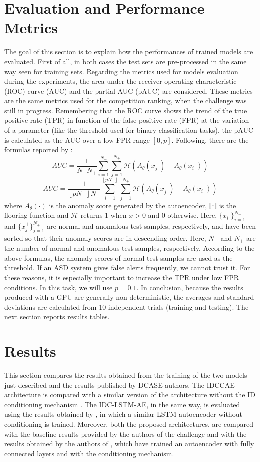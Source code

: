\section{Evaluation and Performance Metrics}
The goal of this section is to explain how the performances of trained models are evaluated. First of all, in both cases the test sets are pre-processed in the same way seen for training sets. Regarding the metrics used for models evaluation during the experiments, the area under the receiver operating characteristic (ROC) curve (AUC) and the partial-AUC (pAUC) are considered. These metrics are the same metrics used for the competition ranking, when the challenge was still in progress. Remembering that the ROC curve shows the trend of the true positive rate (TPR) in function of the false positive rate (FPR) at the variation of a parameter (like the threshold used for binary classification tasks), the pAUC is calculated as the AUC over a low FPR range $[0,p]$. Following, there are the formulas reported by \cite{DCASE}:
\[ AUC =\frac{1}{N_-N_+}\sum_{i=1}^{N_-}\sum_{j=1}^{N_+}\mathcal{H}(A_\theta(x_j^+)-A_\theta(x_i^-)) \]
\[AUC =\frac{1}{ \left \lfloor pN_- \right \rfloor N_+}\sum_{i=1}^{ \left \lfloor pN_- \right \rfloor }\sum_{j=1}^{N_+}\mathcal{H}(A_\theta(x_j^+)-A_\theta(x_i^-))\]
where $A_\theta(\cdot)$ is the anomaly score generated by the autoencoder, ⌊⋅⌋ is the flooring function and $\mathcal{H}$ returns 1 when $x>0$ and $0$ otherwise. Here, $\{x^−_i\}^{N_-}_{i=1}$
and $\{x^+_j\}^{N_+}_{j=1}$ are normal and anomalous test samples, respectively, and have been sorted so that their anomaly scores are in descending order. Here, $N_−$ and $N_+$
are the number of normal and anomalous test samples, respectively. According to the above formulas, the anomaly scores of normal test samples are used as the threshold. If an ASD system gives false alerts frequently, we cannot trust it. For these reasons, it is especially important to increase the TPR under low FPR conditions. In this task, we will use $p=0.1$. In conclusion, because the results produced with a GPU are generally non-deterministic, the averages and standard deviations are calculated from 10 independent trials (training and testing). The next section reports results tables.

\section{Results}
This section compares the results obtained from the training of the two models just described and the results published by DCASE authors. The IDCCAE architecture is compared with a similar version of the architecture without the ID conditioning mechanism \cite{15DeepDenseConvAE}. The IDC-LSTM-AE, in the same way, is evaluated using the results obtained by \cite{16LSTMDeepAutoencodersForASDtask}, in which a similar LSTM autoencoder without conditioning is trained. 
Moreover, both the proposed architectures, are compared with the baseline results provided by the authors of the challenge and with the results obtained by the authors of \cite{18IDConditionedAutoEncoder}, which have trained an autoencoder with fully connected layers and with the conditioning mechanism.

